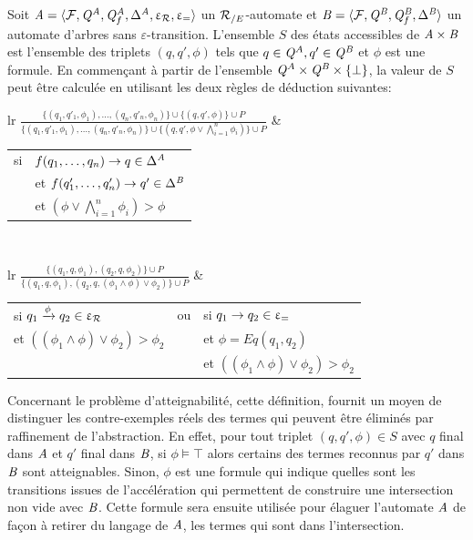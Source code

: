 \begin{definition}
  \label{def:reachable-states}
  Soit $\mathit A =\langle \mathcal{F}, \mathit Q^\mathit A,\mathit Q^\mathit A_f,\Delta^\mathit A, \upvarepsilon_{\mathcal R}, \upvarepsilon_{=} \rangle$ un ${\mathcal R_{/E}}$-automate et
  $\mathit B=\langle \mathcal{F}, \mathit Q^\mathit B,\mathit Q^\mathit B_f,\Delta^\mathit B \rangle$ un automate d'arbres sans $\varepsilon$-transition.
  L'ensemble $S$ des états accessibles de $\mathit A \times \mathit B$ est l'ensemble des triplets $(q,q',\phi)$ tels que
  $q\in\mathit Q^A,q'\in\mathit Q^\mathit B$ et $\phi$ est une formule. En commençant à partir de l'ensemble  $\mathit Q^A
  \times \mathit Q^\mathit B \times \{ \bot\}$, la valeur de $S$ peut être calculée en utilisant les deux règles de déduction
  suivantes:

\medskip
\noindent
{\footnotesize
  \centering
  \hspace*{-1.25cm}
  \begin{tabular}{lr}
    $\displaystyle\frac
    {\{(q_1,q'_1, \phi_1), \ldots, (q_n,q'_n,\phi_n)\} \cup \{(q,q',\phi)\} \cup P}
    {\{(q_1,q'_1,\phi_1), \ldots, (q_n,q'_n,\phi_n)\} \cup \{(q,q',\phi \vee \bigwedge_{i=1}^n \phi_i)\}
      \cup P}$ &  
    \quad
    \begin{tabular}{cl}
      si &$f(q_1, \ldots, q_n) \rightarrow q \in \Delta^\mathit A$  \\ 
      &et $f(q'_1, \ldots, q'_n) \rightarrow q' \in \Delta^\mathit B$  \\ 
      &et $(\phi \vee \bigwedge_{i=1}^n \phi_i) > \phi$ 
    \end{tabular}
  \end{tabular}\\
  \vspace*{1cm}
  \begin{tabular}{lr}
    $\displaystyle\frac   
    {\{(q_1,q,\phi_1), (q_2,q,\phi_2)\} \cup P}
    {\{(q_1,q,\phi_1), (q_2,q,(\phi_1 \wedge \phi) \vee \phi_2)\} \cup P}$
    &
    \begin{tabular}{lcl}
      si $q_1 \xrightarrow{\phi} q_2 \in \upvarepsilon_{\mathcal R}$ &ou& si $q_1 \rightarrow q_2 \in \upvarepsilon_{=}$ \\
      et $((\phi_1 \wedge \phi) \vee \phi_2) > \phi_2$ && et $\phi=Eq(q_1,q_2)$ \\
      && et $((\phi_1 \wedge \phi) \vee \phi_2) > \phi_2$ 
    \end{tabular}
  \end{tabular}
}
\end{definition}

Concernant le problème d'atteignabilité, cette définition, fournit un moyen
de distinguer les contre-exemples réels des termes qui peuvent être éliminés
par raffinement de l'abstraction. En effet, pour tout triplet $(q,q',\phi)\in S$ avec $q$ final dans $\mathit A$ et $q'$ final
dans $\mathit B$, si $\phi \models \top$ alors certains des termes reconnus par $q'$ dans $\mathit B$ sont atteignables. 
Sinon, $\phi$ est une formule qui indique quelles sont les transitions issues de l'accélération qui permettent
de construire une intersection non vide avec $\mathit B$. Cette formule sera ensuite utilisée pour élaguer l'automate $\mathit A$
de façon à retirer du langage de $\mathit A$, les termes qui sont dans l'intersection.

